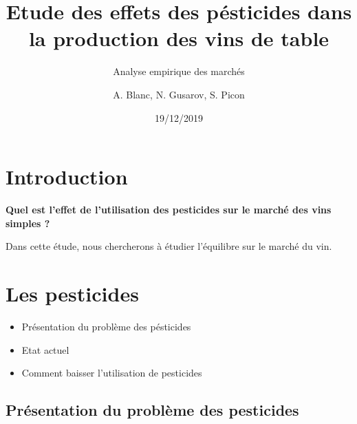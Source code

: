 \documentclass[11pt,]{article}
\title{Etude des effets des pésticides dans la production des vins de table}
\subtitle{Analyse empirique des marchés}
\author{A. Blanc, N. Gusarov, S. Picon}
\date{19/12/2019}
\providecommand{\tightlist}{%
  \setlength{\itemsep}{0pt}\setlength{\parskip}{0pt}}
\begin{document}
\maketitle

\FloatBarrier

\FloatBarrier

\FloatBarrier

\FloatBarrier

\FloatBarrier

\FloatBarrier

\FloatBarrier

\FloatBarrier

\FloatBarrier

\FloatBarrier

\hypertarget{introduction}{%
\section{Introduction}\label{introduction}}

\FloatBarrier

\textbf{Quel est l'effet de l'utilisation des pesticides sur le marché des vins simples ?}

Dans cette étude, nous chercherons à étudier l'équilibre sur le marché
du vin.

\hypertarget{les-pesticides}{%
\section{Les pesticides}\label{les-pesticides}}

\begin{itemize}
\tightlist
\item
  Présentation du problème des pésticides
\item
  Etat actuel
\item
  Comment baisser l'utilisation de pesticides
\end{itemize}

\FloatBarrier

\hypertarget{presentation-du-probleme-des-pesticides}{%
\subsection{Présentation du problème des
pesticides}\label{presentation-du-probleme-des-pesticides}}
\end{document}
